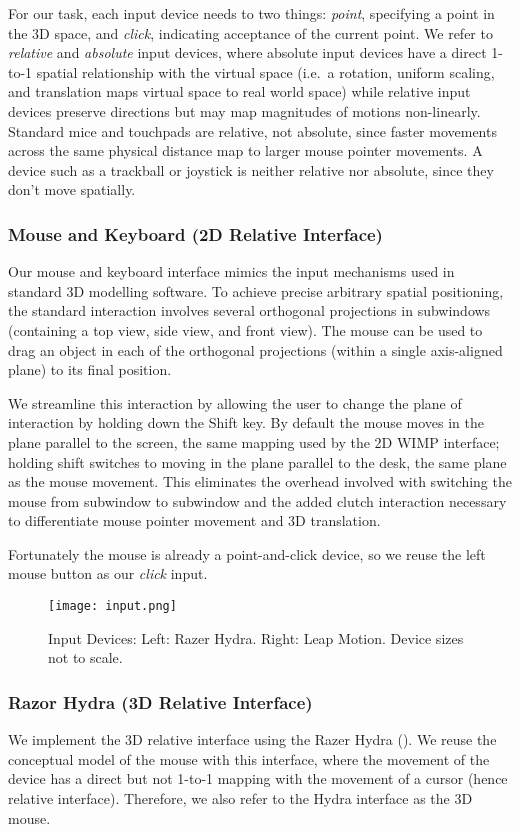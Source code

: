 For our task, each input device needs to two things: {\it point}, specifying a
point in the 3D space, and {\it click}, indicating acceptance of the current
point. We refer to {\it relative} and {\it absolute} input devices, where
absolute input devices have a direct 1-to-1 spatial relationship with the
virtual space (i.e.\ a rotation, uniform scaling, and translation maps virtual
space to real world space) while relative input devices preserve directions
but may map magnitudes of motions non-linearly. Standard mice and touchpads
are relative, not absolute, since faster movements across the same physical
distance map to larger mouse pointer movements. A device such as a trackball
or joystick is neither relative nor absolute, since they don't move spatially.

\subsubsection{Mouse and Keyboard (2D Relative Interface)}
Our mouse and keyboard interface mimics the input mechanisms used in standard
3D modelling software. To achieve precise arbitrary spatial positioning, the
standard interaction involves several orthogonal projections in subwindows
(containing a top view, side view, and front view). The mouse can be used to
drag an object in each of the orthogonal projections (within a single
axis-aligned plane) to its final position.

We streamline this interaction by allowing the user to change the plane of
interaction by holding down the Shift key. By default the mouse moves in the
plane parallel to the screen, the same mapping used by the 2D WIMP interface;
holding shift switches to moving in the plane parallel to the desk, the same
plane as the mouse movement. This eliminates the overhead involved with
switching the mouse from subwindow to subwindow and the added clutch
interaction \cite{bravenuiworld} necessary to differentiate mouse pointer
movement and 3D translation.

Fortunately the mouse is already a point-and-click device, so we reuse the
left mouse button as our {\it click} input.

\begin{figure}
    \centering
    \texttt{[image: input.png]}
    \caption{Input Devices: Left: Razer Hydra. Right: Leap Motion. Device sizes
        not to scale.}
    \label{fig:input}
\end{figure}

\subsubsection{Razor Hydra (3D Relative Interface)}
We implement the 3D relative interface using the Razer Hydra
(). We reuse the
conceptual model of the mouse with this interface, where the movement of the
device has a direct but not 1-to-1 mapping with the movement of a cursor (hence
relative interface). Therefore, we also refer to the Hydra interface as the 3D
mouse.

